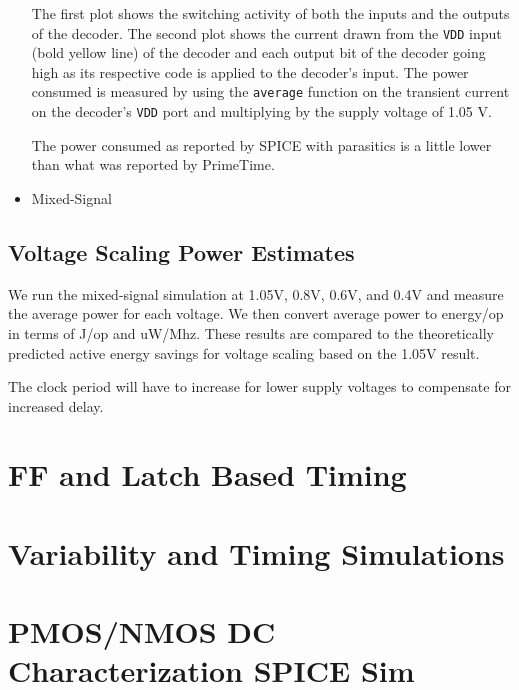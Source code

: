 \documentclass[11pt]{article}
\begin{document}
\begin{itemize}
	The first plot shows the switching activity of both the inputs and the outputs of the decoder. The second plot shows the current drawn from the \verb|VDD| input (bold yellow line) of the decoder and each output bit of the decoder going high as its respective code is applied to the decoder's input. The power consumed is measured by using the \verb|average| function on the transient current on the decoder's \verb|VDD| port and multiplying by the supply voltage of 1.05 V.
	
	The power consumed as reported by SPICE with parasitics is a little lower than what was reported by PrimeTime.
	
	\item Mixed-Signal
\end{itemize}

\subsection{Voltage Scaling Power Estimates}
We run the mixed-signal simulation at 1.05V, 0.8V, 0.6V, and 0.4V and measure the average power for each voltage. We then convert average power to energy/op in terms of J/op and uW/Mhz. These results are compared to the theoretically predicted active energy savings for voltage scaling based on the 1.05V result.

The clock period will have to increase for lower supply voltages to compensate for increased delay.

\section{FF and Latch Based Timing}

\section{Variability and Timing Simulations}

\newpage
\appendix
\section{PMOS/NMOS DC Characterization SPICE Sim} \label{dc_characterization_spice}
\end{document}
